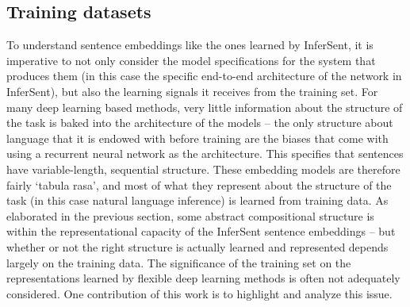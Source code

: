 

\subsection{Training datasets}
To understand sentence embeddings like the ones learned by InferSent, it is imperative to not only consider the model specifications for the system that produces them (in this case the specific end-to-end architecture of the network in InferSent), but also the learning signals it receives from the training set. For many deep learning based methods, very little information about the structure of the task is baked into the architecture of the models -- the only structure about language that it is endowed with before training are the biases that come with using a recurrent neural network as the architecture. This specifies that sentences have variable-length, sequential structure. These embedding models are therefore fairly `tabula rasa', and most of what they represent about the structure of the task (in this case natural language inference) is learned from training data. As elaborated in the previous section, some abstract compositional structure is within the representational capacity of the InferSent sentence embeddings -- but whether or not the right structure is actually learned and represented depends largely on the training data. The significance of the training set on the representations learned by flexible deep learning methods is often not adequately considered. One contribution of this work is to highlight and analyze this issue.
 
